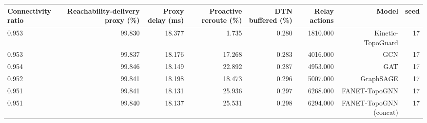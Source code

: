 \begin{tabular}{lrrrrrrr}
\toprule
Connectivity ratio & Reachability-delivery proxy (\%) & Proxy delay (ms) & Proactive reroute (\%) & DTN buffered (\%) & Relay actions & Model & seed \\
\midrule
0.953 & 99.830 & 18.377 & 1.735 & 0.280 & 1810.000 & Kinetic-TopoGuard & 17 \\
0.953 & 99.837 & 18.176 & 17.268 & 0.283 & 4016.000 & GCN & 17 \\
0.954 & 99.846 & 18.149 & 22.892 & 0.287 & 4953.000 & GAT & 17 \\
0.952 & 99.841 & 18.198 & 18.473 & 0.296 & 5007.000 & GraphSAGE & 17 \\
0.951 & 99.841 & 18.131 & 25.936 & 0.297 & 6268.000 & FANET-TopoGNN & 17 \\
0.951 & 99.840 & 18.137 & 25.531 & 0.298 & 6294.000 & FANET-TopoGNN (concat) & 17 \\
\bottomrule
\end{tabular}